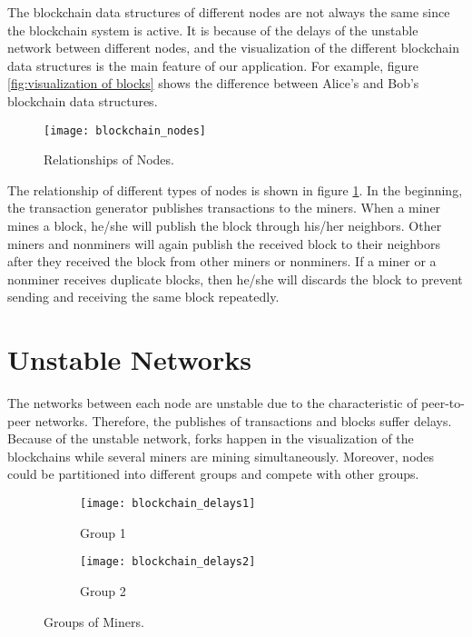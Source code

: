 The blockchain data structures of different nodes are not always the same since the blockchain system is active. It is because of the delays of the unstable network between different nodes, and the visualization of the different blockchain data structures is the main feature of our application. For example, figure \ref{fig:visualization of blocks} shows the difference between Alice's and Bob's blockchain data structures.

\begin{figure}[htb]
    \centering
    \texttt{[image: blockchain\_nodes]}
    \caption{Relationships of Nodes.}
    \label{fig:relationship of nodes}
\end{figure}

The relationship of different types of nodes is shown in figure \ref{fig:relationship of nodes}. In the beginning, the transaction generator publishes transactions to the miners. When a miner mines a block, he/she will publish the block through his/her neighbors. Other miners and nonminers will again publish the received block to their neighbors after they received the block from other miners or nonminers. If a miner or a nonminer receives duplicate blocks, then he/she will discards the block to prevent sending and receiving the same block repeatedly.

\section{Unstable Networks}

The networks between each node are unstable due to the characteristic of peer-to-peer networks. Therefore, the publishes of transactions and blocks suffer delays. Because of the unstable network, forks happen in the visualization of the blockchains while several miners are mining simultaneously. Moreover, nodes could be partitioned into different groups and compete with other groups.

\begin{figure}[htb]
    \centering
    \begin{subfigure}[b]{1\textwidth}
        \centering
        \texttt{[image: blockchain\_delays1]}
        \caption{Group 1}
    \end{subfigure}
    
    \begin{subfigure}[b]{1\textwidth}
        \centering
        \texttt{[image: blockchain\_delays2]}
        \caption{Group 2}
    \end{subfigure}

    \caption{Groups of Miners.}
    \label{fig:groups of miners}
\end{figure}

